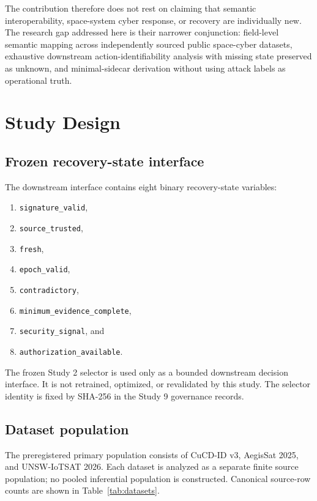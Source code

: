 \documentclass[preprint,12pt]{elsarticle}
\begin{document}
The contribution therefore does not rest on claiming that semantic interoperability, space-system cyber response, or recovery are individually new. The research gap addressed here is their narrower conjunction: field-level semantic mapping across independently sourced public space-cyber datasets, exhaustive downstream action-identifiability analysis with missing state preserved as unknown, and minimal-sidecar derivation without using attack labels as operational truth.

\section{Study Design}

\subsection{Frozen recovery-state interface}

The downstream interface contains eight binary recovery-state variables:
\begin{enumerate}[label=(\arabic*)]
    \item \texttt{signature\_valid},
    \item \texttt{source\_trusted},
    \item \texttt{fresh},
    \item \texttt{epoch\_valid},
    \item \texttt{contradictory},
    \item \texttt{minimum\_evidence\_complete},
    \item \texttt{security\_signal}, and
    \item \texttt{authorization\_available}.
\end{enumerate}

The frozen Study 2 selector is used only as a bounded downstream decision interface. It is not retrained, optimized, or revalidated by this study. The selector identity is fixed by SHA-256 in the Study 9 governance records.

\subsection{Dataset population}

The preregistered primary population consists of CuCD-ID v3, AegisSat 2025, and UNSW-IoTSAT 2026. Each dataset is analyzed as a separate finite source population; no pooled inferential population is constructed. Canonical source-row counts are shown in Table~\ref{tab:datasets}.
\end{document}
